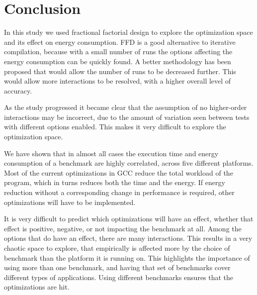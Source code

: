 \documentclass[twocolumn]{article}
\newcommand{\nsection}[1]{\section{\bfseries #1}}
\newcommand{\todo}[1]{\textbf{\textcolor{red}{#1}}}
\begin{document}

\nsection{Conclusion}


In this study we used fractional factorial design to explore the optimization space and its effect on energy consumption. FFD is a good alternative to iterative compilation, because with a small number of runs the options affecting the energy consumption can be quickly found. A better methodology has been proposed that would allow the number of runs to be decreased further. This would allow more interactions to be resolved, with a higher overall level of accuracy.

As the study progressed it became clear that the assumption of no higher-order interactions may be incorrect, due to the amount of variation seen between tests with different options enabled. This makes it very difficult to explore the optimization space.

We have shown that in almost all cases the execution time and energy consumption of a benchmark are highly correlated, across five different platforms. Most of the current optimizations in GCC reduce the total workload of the program, which in turns reduces both the time and the energy. If energy reduction without a corresponding change in performance is required, other optimizations will have to be implemented.

It is very difficult to predict which optimizations will have an effect, whether that effect is positive, negative, or not impacting the benchmark at all. Among the options that do have an effect, there are many interactions. This results in a very chaotic space to explore, that empirically is affected more by the choice of benchmark than the platform it is running on. This highlights the importance of using more than one benchmark, and having that set of benchmarks cover different types of applications. Using different benchmarks ensures that the optimizations are hit.






\printbibliography
\end{document}
